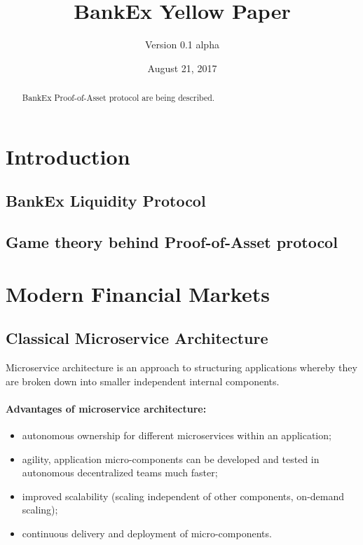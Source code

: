 \documentclass{article}
\title{BankEx Yellow Paper}
\author{Version 0.1 alpha}
\date{August 21, 2017}
\begin{document}
\maketitle

\begin{abstract}
BankEx Proof-of-Asset protocol are being described.
\end{abstract}

\vspace{24pt}


\section{Introduction}

\subsection{BankEx Liquidity Protocol}

\subsection{Game theory behind Proof-of-Asset protocol}

\section{Modern Financial Markets}

\subsection{Classical Microservice Architecture}

Microservice architecture is an approach to structuring applications whereby they are broken down into smaller independent internal components.

\paragraph{Advantages of microservice architecture:}

\begin{itemize}
\item autonomous ownership for different microservices within an application;
\item agility, application micro-components can be developed and tested in autonomous decentralized teams much faster;
\item improved scalability (scaling independent of other components, on-demand scaling);
\item continuous delivery and deployment of micro-components.
\end{itemize}
\end{document}
